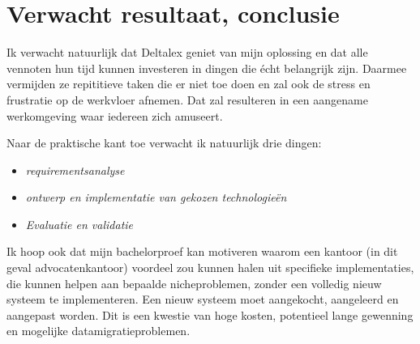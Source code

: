 \section{Verwacht resultaat, conclusie}%
\label{sec:verwachte_resultaten}
Ik verwacht natuurlijk dat Deltalex geniet van mijn oplossing en dat alle vennoten hun tijd kunnen investeren in dingen die écht belangrijk zijn. Daarmee vermijden ze repititieve taken die er niet toe doen en zal ook de stress en frustratie op de werkvloer afnemen. Dat zal resulteren in een aangename werkomgeving waar iedereen zich amuseert. 

Naar de praktische kant toe verwacht ik natuurlijk drie dingen:

\begin{itemize}
        \item \emph{requirementsanalyse}
        \item \emph{ontwerp en implementatie van gekozen technologieën}
        \item \emph{Evaluatie en validatie}
\end{itemize}

Ik hoop ook dat mijn bachelorproef kan motiveren waarom een kantoor (in dit geval advocatenkantoor) voordeel zou kunnen halen uit specifieke implementaties, die kunnen helpen aan bepaalde nicheproblemen, zonder een volledig nieuw systeem te implementeren. Een nieuw systeem moet aangekocht, aangeleerd en aangepast worden. Dit is een kwestie van hoge kosten, potentieel lange gewenning en mogelijke datamigratieproblemen. 
